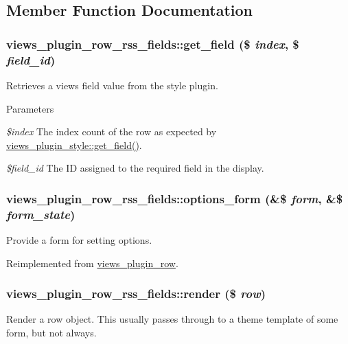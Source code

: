 \subsection{Member Function Documentation}
\hypertarget{classviews__plugin__row__rss__fields_a5ff87a83e78198b5efc6f13766750595}{
\subsubsection[{get\_\-field}]{\setlength{\rightskip}{0pt plus 5cm}views\_\-plugin\_\-row\_\-rss\_\-fields::get\_\-field (\$ {\em index}, \/  \$ {\em field\_\-id})}}
\label{classviews__plugin__row__rss__fields_a5ff87a83e78198b5efc6f13766750595}
Retrieves a views field value from the style plugin.


\begin{DoxyParams}{Parameters}
\item[{\em \$index}]The index count of the row as expected by \hyperlink{classviews__plugin__style_add1dccbb850840911c335ae09ff266d7}{views\_\-plugin\_\-style::get\_\-field()}. \item[{\em \$field\_\-id}]The ID assigned to the required field in the display. \end{DoxyParams}
\hypertarget{classviews__plugin__row__rss__fields_ab1747e15303777895d87d7cc8f37a788}{
\subsubsection[{options\_\-form}]{\setlength{\rightskip}{0pt plus 5cm}views\_\-plugin\_\-row\_\-rss\_\-fields::options\_\-form (\&\$ {\em form}, \/  \&\$ {\em form\_\-state})}}
\label{classviews__plugin__row__rss__fields_ab1747e15303777895d87d7cc8f37a788}
Provide a form for setting options. 

Reimplemented from \hyperlink{classviews__plugin__row_a6914c39d64977a0aa71da39cc1af004e}{views\_\-plugin\_\-row}.\hypertarget{classviews__plugin__row__rss__fields_a5ee883780c5e3aa5469969022fdd9186}{
\subsubsection[{render}]{\setlength{\rightskip}{0pt plus 5cm}views\_\-plugin\_\-row\_\-rss\_\-fields::render (\$ {\em row})}}
\label{classviews__plugin__row__rss__fields_a5ee883780c5e3aa5469969022fdd9186}
Render a row object. This usually passes through to a theme template of some form, but not always.


